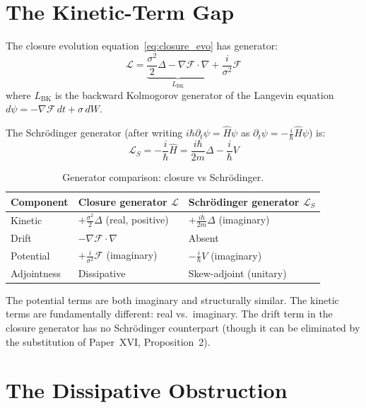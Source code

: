 \documentclass[12pt]{article}
\newcommand{\Fcal}{\mathcal{F}}
\newcommand{\Lcal}{\mathcal{L}}
\begin{document}
\section{The Kinetic-Term Gap}\label{sec:gap}

The closure evolution equation~\eqref{eq:closure_evo} has generator:
\begin{equation}
    \Lcal = \underbrace{\frac{\sigma^2}{2}\Delta - \nabla\Fcal\cdot\nabla}_{L_{\mathrm{BK}}} + \frac{i}{\sigma^2}\Fcal
\end{equation}
where $L_{\mathrm{BK}}$ is the backward Kolmogorov generator of the Langevin equation $d\psi = -\nabla\Fcal\,dt + \sigma\,dW$.

The Schr\"odinger generator (after writing $i\hbar\partial_t\psi = \hat{H}\psi$ as $\partial_t\psi = -\frac{i}{\hbar}\hat{H}\psi$) is:
\begin{equation}
    \Lcal_S = -\frac{i}{\hbar}\hat{H} = \frac{i\hbar}{2m}\Delta - \frac{i}{\hbar}V
\end{equation}

\begin{table}[ht]
\centering
\caption{Generator comparison: closure vs Schr\"odinger.}
\label{tab:generators}
\begin{tabular}{@{}lll@{}}
\toprule
Component & Closure generator $\Lcal$ & Schr\"odinger generator $\Lcal_S$ \\
\midrule
Kinetic & $+\frac{\sigma^2}{2}\Delta$ (real, positive) & $+\frac{i\hbar}{2m}\Delta$ (imaginary) \\
Drift & $-\nabla\Fcal\cdot\nabla$ & Absent \\
Potential & $+\frac{i}{\sigma^2}\Fcal$ (imaginary) & $-\frac{i}{\hbar}V$ (imaginary) \\
Adjointness & Dissipative & Skew-adjoint (unitary) \\
\bottomrule
\end{tabular}
\end{table}

The potential terms are both imaginary and structurally similar. The kinetic terms are fundamentally different: real vs.\ imaginary. The drift term in the closure generator has no Schr\"odinger counterpart (though it can be eliminated by the substitution of Paper~XVI, Proposition~2).

\section{The Dissipative Obstruction}\label{sec:nogo}
\end{document}
